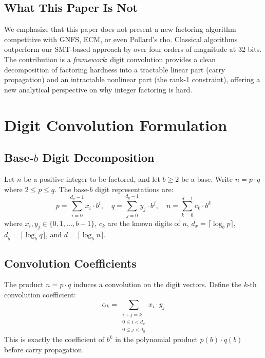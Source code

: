 \documentclass[11pt,a4paper]{article}
\begin{document}
\subsection{What This Paper Is Not}

We emphasize that this paper does not present a new factoring algorithm competitive with GNFS, ECM, or even Pollard's rho. Classical algorithms outperform our SMT-based approach by over four orders of magnitude at 32 bits. The contribution is a \emph{framework}: digit convolution provides a clean decomposition of factoring hardness into a tractable linear part (carry propagation) and an intractable nonlinear part (the rank-1 constraint), offering a new analytical perspective on why integer factoring is hard.

\section{Digit Convolution Formulation}
\label{sec:formulation}

\subsection{Base-$b$ Digit Decomposition}

Let $n$ be a positive integer to be factored, and let $b \ge 2$ be a base. Write $n = p \cdot q$ where $2 \le p \le q$. The base-$b$ digit representations are:
\begin{equation}
p = \sum_{i=0}^{d_x - 1} x_i \cdot b^i, \quad q = \sum_{j=0}^{d_y - 1} y_j \cdot b^j, \quad n = \sum_{k=0}^{d-1} c_k \cdot b^k
\end{equation}
where $x_i, y_j \in \{0, 1, \ldots, b-1\}$, $c_k$ are the known digits of $n$, $d_x = \lceil \log_b p \rceil$, $d_y = \lceil \log_b q \rceil$, and $d = \lceil \log_b n \rceil$.

\subsection{Convolution Coefficients}

The product $n = p \cdot q$ induces a convolution on the digit vectors. Define the $k$-th convolution coefficient:
\begin{equation}
\alpha_k = \sum_{\substack{i + j = k \\ 0 \le i < d_x \\ 0 \le j < d_y}} x_i \cdot y_j
\end{equation}
This is exactly the coefficient of $b^k$ in the polynomial product $p(b) \cdot q(b)$ before carry propagation.
\end{document}
